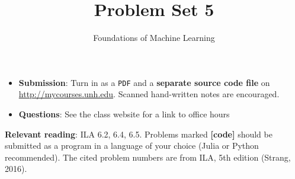 \documentclass[letterpaper]{article}
\title{Problem Set 5}
\author{Foundations of Machine Learning}
\date{}
\begin{document}
\maketitle

\begin{itemize}
\item \textbf{Submission}: Turn in as a \texttt{PDF} and a \textbf{separate source code file} on \url{http://mycourses.unh.edu}. Scanned hand-written notes are encouraged.
\item \textbf{Questions}: See the class website for a link to office hours
\end{itemize}


\textbf{Relevant reading}: ILA 6.2, 6.4, 6.5. Problems marked \textbf{[code]} should be submitted as a program in a language of your choice (Julia or Python recommended). The cited problem numbers are from ILA, 5th edition (Strang, 2016).
\end{document}
